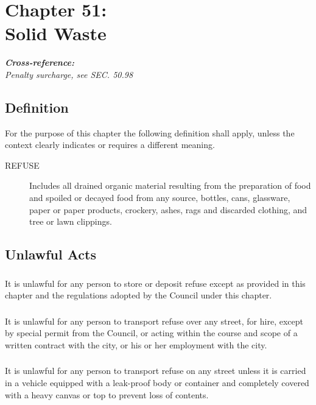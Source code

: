 \chapter*{Chapter 51: \\
	Solid Waste}
    \vfill
    \minitoc
    \textbf{\emph{{Cross-reference:}}}\\
    \indent\emph{Penalty surcharge, see SEC. 50.98}
    \pagebreak

\section{Definition}
For the purpose of this chapter the following definition shall apply, unless the context clearly indicates or requires a different meaning.
\begin{description}
    \item[REFUSE] Includes all drained organic material resulting from the preparation of food and spoiled or decayed food from any source, bottles, cans, glassware, paper or paper products, crockery, ashes, rags and discarded clothing, and tree or lawn clippings.
\end{description}

\section{Unlawful Acts}
\subsection{}
It is unlawful for any person to store or deposit refuse except as provided in this chapter and the regulations adopted by the Council under this chapter.
\subsection{}
It is unlawful for any person to transport refuse over any street, for hire, except by special permit from the Council, or acting within the course and scope of a written contract with the city, or his or her employment with the city.
\subsection{}
It is unlawful for any person to transport refuse on any street unless it is carried in a vehicle equipped with a leak-proof body or container and completely covered with a heavy canvas or top to prevent loss of contents.

